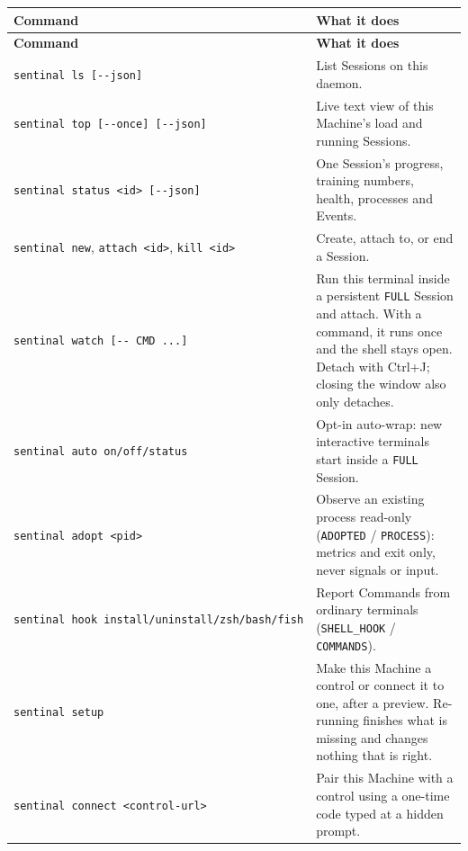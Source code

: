 \begin{small}
\begin{longtable}{>{\raggedright\arraybackslash}p{0.373\dimexpr \linewidth-4\tabcolsep\relax}>{\raggedright\arraybackslash}p{0.627\dimexpr \linewidth-4\tabcolsep\relax}}
\toprule
\textbf{Command} & \textbf{What it does} \\
\midrule
\endfirsthead
\toprule
\textbf{Command} & \textbf{What it does} \\
\midrule
\endhead
\texttt{sentinal\ ls\ [-{}\allowbreak{}-{}\allowbreak{}json]} & List Sessions on this daemon. \\
\texttt{sentinal\ top\ [-{}\allowbreak{}-{}\allowbreak{}once]\ [-{}\allowbreak{}-{}\allowbreak{}json]} & Live text view of this Machine's load and running Sessions. \\
\texttt{sentinal\ status\ \textless{}id\textgreater{}\ [-{}\allowbreak{}-{}\allowbreak{}json]} & One Session's progress, training numbers, health, processes and Events. \\
\texttt{sentinal\ new}, \texttt{attach\ \textless{}id\textgreater{}}, \texttt{kill\ \textless{}id\textgreater{}} & Create, attach to, or end a Session. \\
\texttt{sentinal\ watch\ [-{}\allowbreak{}-{}\allowbreak{}\ CMD\ .\allowbreak{}.\allowbreak{}.\allowbreak{}]} & Run this terminal inside a persistent \texttt{FULL} Session and attach. With a command, it runs once and the shell stays open. Detach with Ctrl+J; closing the window also only detaches. \\
\texttt{sentinal\ auto\ on/\allowbreak{}off/\allowbreak{}status} & Opt-in auto-wrap: new interactive terminals start inside a \texttt{FULL} Session. \\
\texttt{sentinal\ adopt\ \textless{}pid\textgreater{}} & Observe an existing process read-only (\texttt{ADOPTED} / \texttt{PROCESS}): metrics and exit only, never signals or input. \\
\texttt{sentinal\ hook\ install/\allowbreak{}uninstall/\allowbreak{}zsh/\allowbreak{}bash/\allowbreak{}fish} & Report Commands from ordinary terminals (\texttt{SHELL\_\allowbreak{}HOOK} / \texttt{COMMANDS}). \\
\texttt{sentinal\ setup} & Make this Machine a control or connect it to one, after a preview. Re-running finishes what is missing and changes nothing that is right. \\
\texttt{sentinal\ connect\ \textless{}control-{}\allowbreak{}url\textgreater{}} & Pair this Machine with a control using a one-time code typed at a hidden prompt. \\

\end{longtable}
\end{small}
